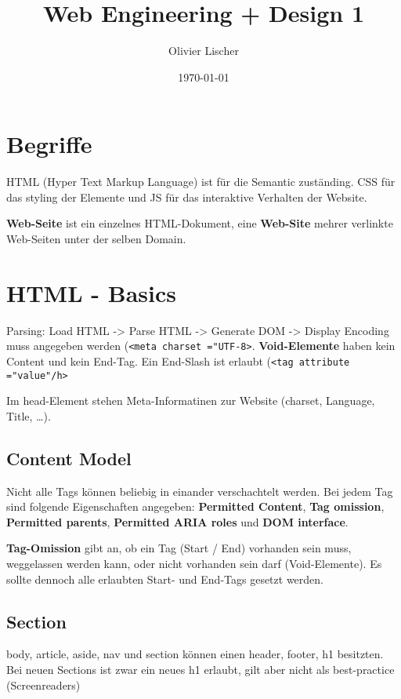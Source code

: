 \documentclass[11pt,twoside,landscape]{article}
\author{Olivier Lischer}
\date{\today}
\title{Web Engineering + Design 1}
\begin{document}
\maketitle
\begin{multicols}{4}
\section*{Begriffe}
\label{sec:org9824f5c}
HTML (Hyper Text Markup Language) ist für die Semantic zuständing. CSS für das styling der Elemente und JS für das interaktive Verhalten der Website.

\textbf{Web-Seite} ist ein einzelnes HTML-Dokument, eine \textbf{Web-Site} mehrer verlinkte Web-Seiten unter der selben Domain.

\section*{HTML - Basics}
\label{sec:orgb4bcfee}
Parsing: Load HTML -> Parse HTML -> Generate DOM -> Display
Encoding muss angegeben werden (\texttt{<meta charset ="UTF-8>}. \textbf{Void-Elemente} haben kein Content und kein End-Tag. Ein End-Slash ist erlaubt (\texttt{<tag attribute ="value"/h>}

Im head-Element stehen Meta-Informatinen zur Website (charset, Language, Title, \ldots{}).

\subsection*{Content Model}
\label{sec:org73b6e07}
Nicht alle Tags können beliebig in einander verschachtelt werden. Bei jedem Tag sind folgende Eigenschaften angegeben: \textbf{Permitted Content}, \textbf{Tag omission}, \textbf{Permitted parents}, \textbf{Permitted ARIA roles} und \textbf{DOM interface}.

\textbf{Tag-Omission} gibt an, ob ein Tag (Start / End) vorhanden sein muss, weggelassen werden kann, oder nicht vorhanden sein darf (Void-Elemente). Es sollte dennoch alle erlaubten Start- und End-Tags gesetzt werden.

\subsection*{Section}
\label{sec:orgb482018}
body, article, aside, nav und section können einen header, footer, h1 besitzten. Bei neuen Sections ist zwar ein neues h1 erlaubt, gilt aber nicht als best-practice (Screenreaders)


\end{multicols}
\end{document}
